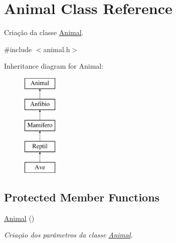 \hypertarget{class_animal}{}\section{Animal Class Reference}
\label{class_animal}


Criação da classe \mbox{\hyperlink{class_animal}{Animal}}.  




{\ttfamily \#include $<$animal.\+h$>$}

Inheritance diagram for Animal\+:\begin{figure}[H]
\begin{center}
\leavevmode
\includegraphics[height=5.000000cm]{class_animal}
\end{center}
\end{figure}
\subsection*{Protected Member Functions}
\begin{DoxyCompactItemize}
\item 
\mbox{\hyperlink{class_animal_a1e726a49ec952443190ac62dad22353c}{Animal}} ()
\begin{DoxyCompactList}\small\item\em Criação dos parâmetros da classe \mbox{\hyperlink{class_animal}{Animal}}. \end{DoxyCompactList}\end{DoxyCompactItemize}
